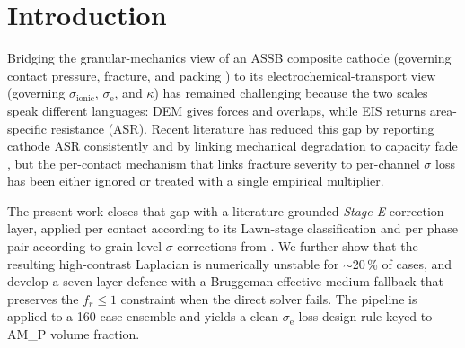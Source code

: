\documentclass[11pt, a4paper]{article}
\newcommand{\sigmaionic}{\ensuremath{\sigma_{\mathrm{ionic}}}}
\newcommand{\sigmae}{\ensuremath{\sigma_{\mathrm{e}}}}
\begin{document}
\section{Introduction}

Bridging the granular-mechanics view of an ASSB composite cathode
\citep{JanekZeier2023} (governing contact pressure, fracture, and
packing \citep{Doux2020}) to its electrochemical-transport view
(governing $\sigmaionic$, $\sigmae$, and $\kappa$) has remained
challenging because the two scales speak different languages: DEM
\citep{CundallStrack1979} gives forces and overlaps, while EIS
returns area-specific resistance (ASR).  Recent literature
\citep{Bielefeld2022, Minnmann2021, Lee2020, Koerver2017a, Lewis2022}
has reduced this gap by reporting cathode ASR consistently and by
linking mechanical degradation to capacity fade
\citep{Koerver2017b, Tippens2019}, but the per-contact mechanism
that links fracture severity to per-channel $\sigma$ loss has been
either ignored or treated with a single empirical multiplier.

The present work closes that gap with a literature-grounded
\emph{Stage E} correction layer, applied per contact according to
its Lawn-stage classification \citep{Lawn1998} and per phase pair
according to grain-level $\sigma$ corrections from
\citet{Cronau2021, Trevisanello2021, Wang2022}.
We further show that the resulting high-contrast Laplacian is
numerically unstable for $\sim$20\,\% of cases, and develop a
seven-layer defence with a Bruggeman effective-medium fallback
\citep{Bruggeman1935} that preserves the
$f_r \le 1$ constraint when the direct solver fails. The pipeline
is applied to a 160-case ensemble and yields a clean
$\sigmae$-loss design rule keyed to AM\_P volume fraction.
\end{document}
